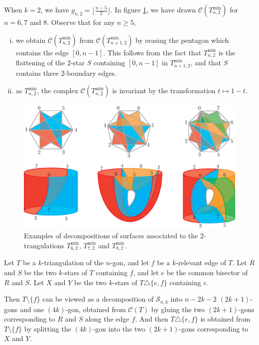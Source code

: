 \documentclass[12pt]{amsart}
\begin{document}
\begin{example}
When $k=2$, we have $g_{n,2}=\lfloor\frac{n-5}{2}\rfloor$.
In figure \ref{surfaces}, we have drawn $\mathcal{C}(T_{n,2}^{\min})$ for $n=6,7$ and $8$. Observe that for any $n\ge 5$, 
\begin{enumerate}[(i)]
\item we obtain $\mathcal{C}(T_{n,2}^{\min})$ from $\mathcal{C}(T_{n+1,2}^{\min})$ by erasing the pentagon which contains the edge $[0,n-1]$. This follows from the fact that $T_{n,2}^{\min}$ is the flattening of the $2$-star $S$ containing $[0,n-1]$ in $T_{n+1,2}^{\min}$, and that $S$ contains three $2$-boundary edges.
\item as $T_{n,2}^{\min}$, the complex $\mathcal{C}(T_{n,2}^{\min})$ is invariant by the transformation $t\mapsto 1-t$.
\end{enumerate}

\begin{figure}
\centerline{\includegraphics[scale=.7]{surfaces.eps}}
\caption{\small{Examples of decompositions of surfaces associated to the $2$-trangulations $T_{6,2}^{\min}$, $T_{7,2}^{\min}$ and $T_{8,2}^{\min}$.}}\label{surfaces}
\end{figure}
\end{example}

Let $T$ be a $k$-triangulation of the $n$-gon, and let $f$ be a $k$-relevant edge of $T$. Let $R$ and $S$ be the two $k$-stars of $T$ containing $f$, and let $e$ be the common bisector of $R$ and $S$. Let $X$ and $Y$ be the two $k$-stars of $T\triangle\{e,f\}$ containing $e$.

Then $T\setminus\{f\}$ can be viewed as a decomposition of $\mathcal{S}_{n,k}$ into $n-2k-2$ $(2k+1)$-gons and one $(4k)$-gon, obtained from $\mathcal{C}(T)$ by gluing the two $(2k+1)$-gons corresponding to $R$ and $S$ along the edge $f$. And then $T\triangle\{e,f\}$ is obtained from $T\setminus\{f\}$ by splitting the $(4k)$-gon into the two $(2k+1)$-gons corresponding to $X$ and $Y$.
\end{document}
